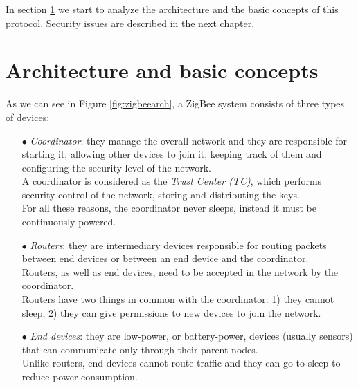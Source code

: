 \documentclass[12pt]{report}
\begin{document}
{In section \ref{sec:zigbeearch} we start to analyze the architecture and the basic concepts of this protocol. Security issues are described in the next chapter.\\

\clearpage
\section{Architecture and basic concepts}
\label{sec:zigbeearch}
\bigskip
As we can see in Figure \ref{fig:zigbeearch}, a ZigBee system consists of three types of devices:

\begin{itemize}
\setlength{\itemindent}{+4mm}
\item[$\bullet$] \emph{Coordinator}: they manage the overall network and they are responsible for starting it, allowing other devices to join it, keeping track of them and configuring the security level of the network.\\
A coordinator is considered as the \emph{Trust Center (TC)}, which performs security control of the network, storing and distributing the  keys.\\
For all these reasons, the coordinator never sleeps, instead it must be continuously powered.


\item[$\bullet$] \emph{Routers}: they are intermediary devices responsible for routing packets between end devices or between an end device and the coordinator.\\
Routers, as well as end devices, need to be accepted in the network by the coordinator.\\
Routers have two things in common with the coordinator: 1) they cannot sleep, 2) they can give permissions to new devices to join the network.

\item[$\bullet$] \emph{End devices}: they are low-power, or battery-power, devices (usually sensors) that can communicate only through their parent nodes.\\
Unlike routers, end devices cannot route traffic and they can go to sleep to reduce power consumption.
\end{itemize}

}
\end{document}
